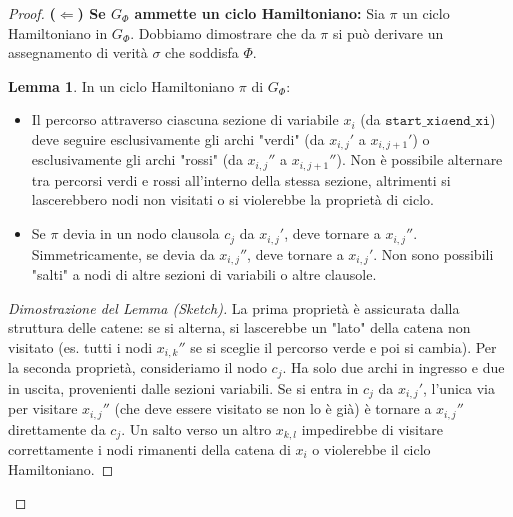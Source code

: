 \documentclass[a4paper]{article}
\theoremstyle{definition} %
\newtheorem{lemma}{Lemma}
\begin{document}
\begin{proof}
\textbf{($\Leftarrow$) Se $G_\Phi$ ammette un ciclo Hamiltoniano:}
Sia $\pi$ un ciclo Hamiltoniano in $G_\Phi$. Dobbiamo dimostrare che da $\pi$ si può derivare un assegnamento di verità $\sigma$ che soddisfa $\Phi$.

\begin{lemma}
In un ciclo Hamiltoniano $\pi$ di $G_\Phi$:
\begin{itemize}
    \item Il percorso attraverso ciascuna sezione di variabile $x_i$ (da $\texttt{start\_xi} a \texttt{end\_xi}$) deve seguire esclusivamente gli archi "verdi" (da $x_{i,j}'$ a $x_{i,j+1}'$) o esclusivamente gli archi "rossi" (da $x_{i,j}''$ a $x_{i,j+1}''$). Non è possibile alternare tra percorsi verdi e rossi all'interno della stessa sezione, altrimenti si lascerebbero nodi non visitati o si violerebbe la proprietà di ciclo.
    \item Se $\pi$ devia in un nodo clausola $c_j$ da $x_{i,j}'$, deve tornare a $x_{i,j}''$. Simmetricamente, se devia da $x_{i,j}''$, deve tornare a $x_{i,j}'$. Non sono possibili "salti" a nodi di altre sezioni di variabili o altre clausole.
\end{itemize}
\end{lemma}
\begin{proof}[Dimostrazione del Lemma (Sketch)]
La prima proprietà è assicurata dalla struttura delle catene: se si alterna, si lascerebbe un "lato" della catena non visitato (es. tutti i nodi $x_{i,k}''$ se si sceglie il percorso verde e poi si cambia). Per la seconda proprietà, consideriamo il nodo $c_j$. Ha solo due archi in ingresso e due in uscita, provenienti dalle sezioni variabili. Se si entra in $c_j$ da $x_{i,j}'$, l'unica via per visitare $x_{i,j}''$ (che deve essere visitato se non lo è già) è tornare a $x_{i,j}''$ direttamente da $c_j$. Un salto verso un altro $x_{k,l}$ impedirebbe di visitare correttamente i nodi rimanenti della catena di $x_i$ o violerebbe il ciclo Hamiltoniano.
\end{proof}


\end{proof}
\end{document}
